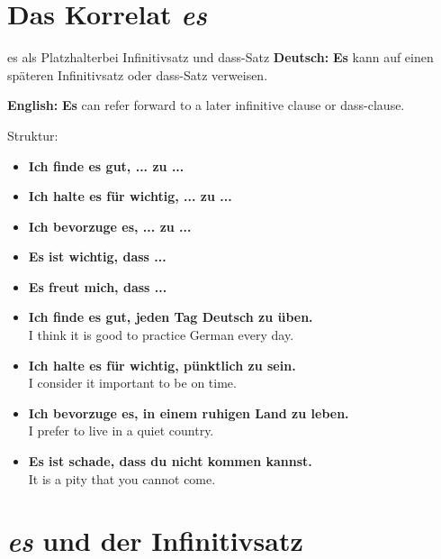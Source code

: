 \documentclass[a4paper,11pt]{article}
\newcommand{\GermanText}[1]{\textbf{Deutsch: }#1\par}
\newcommand{\EnglishText}[1]{{\small\color{SoftGray}\textbf{English: }#1\par}}
\newcommand{\ExampleItem}[2]{\item \textbf{#1}\\{\small\color{SoftGray}#2}}
\begin{document}
    
    \section{Das Korrelat \textit{es}}
        
        \begin{grammarentry}{es als Platzhalter}{bei Infinitivsatz und dass-Satz}
            \GermanText{\textbf{Es} kann auf einen späteren Infinitivsatz oder dass-Satz verweisen.}
            \EnglishText{\textbf{Es} can refer forward to a later infinitive clause or dass-clause.}
            
            Struktur:
            \begin{itemize}
                \item \textbf{Ich finde es gut, ... zu ...}
                \item \textbf{Ich halte es für wichtig, ... zu ...}
                \item \textbf{Ich bevorzuge es, ... zu ...}
                \item \textbf{Es ist wichtig, dass ...}
                \item \textbf{Es freut mich, dass ...}
            \end{itemize}
        \end{grammarentry}
        
        \begin{exbox}
            \begin{itemize}
                \ExampleItem{Ich finde es gut, jeden Tag Deutsch zu üben.}{I think it is good to practice German every day.}
                \ExampleItem{Ich halte es für wichtig, pünktlich zu sein.}{I consider it important to be on time.}
                \ExampleItem{Ich bevorzuge es, in einem ruhigen Land zu leben.}{I prefer to live in a quiet country.}
                \ExampleItem{Es ist schade, dass du nicht kommen kannst.}{It is a pity that you cannot come.}
            \end{itemize}
        \end{exbox}
    
    
    \section{\textit{es} und der Infinitivsatz}
        
\end{document}
